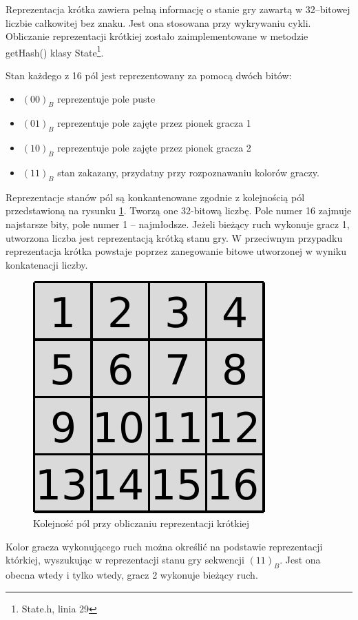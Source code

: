 \documentclass{scrartcl}
\begin{document}
Reprezentacja krótka zawiera pełną informację o stanie gry zawartą
w 32--bitowej liczbie całkowitej bez znaku. Jest ona stosowana przy
wykrywaniu cykli. Obliczanie reprezentacji krótkiej zostało
zaimplementowane w metodzie getHash() klasy State\footnote{
State.h, linia 29}.

Stan każdego z 16 pól jest reprezentowany za pomocą dwóch
bitów:
\begin{itemize}
\item $(00)_B$ reprezentuje pole puste
\item $(01)_B$ reprezentuje pole zajęte przez pionek gracza 1
\item $(10)_B$ reprezentuje pole zajęte przez pionek gracza 2
\item $(11)_B$ stan zakazany, przydatny przy rozpoznawaniu kolorów
  graczy.
\end{itemize}

Reprezentacje stanów pól są konkantenowane zgodnie z kolejnością pól
przedstawioną na rysunku \ref{fig:field_order}. Tworzą one 32-bitową
liczbę. Pole numer 16 zajmuje najstarsze bity, pole numer 1 --
najmłodsze. Jeżeli bieżący ruch wykonuje gracz 1,
utworzona liczba jest reprezentacją krótką stanu gry. W przeciwnym
przypadku reprezentacja krótka powstaje 
poprzez zanegowanie bitowe utworzonej w wyniku konkatenacji liczby.

\begin{figure}[h]
  \centering
  \includegraphics{data/field_order.pdf}
  \caption{Kolejność pól przy obliczaniu reprezentacji krótkiej}
  \label{fig:field_order}
\end{figure}

Kolor gracza wykonującego ruch można określić na podstawie
reprezentacji którkiej, wyszukując w
reprezentacji stanu gry sekwencji $(11)_B$. Jest ona obecna wtedy i
tylko wtedy, gracz 2 wykonuje bieżący ruch.
\end{document}
